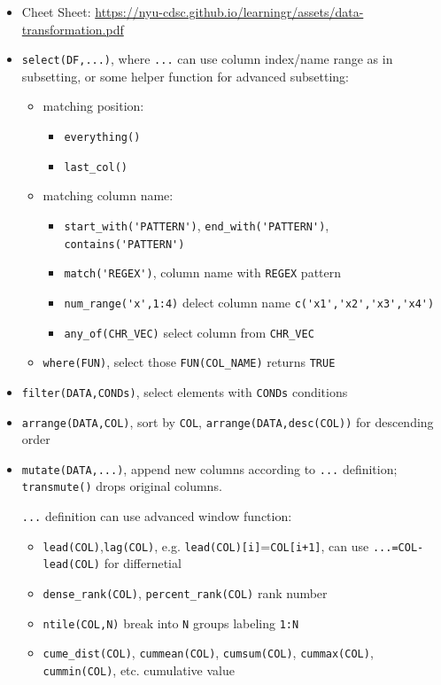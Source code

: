 \begin{itemize}[topsep=2pt,itemsep=0pt]
    \item Cheet Sheet: \url{https://nyu-cdsc.github.io/learningr/assets/data-transformation.pdf}
    \item \lstinline|select(DF,...)|, where \lstinline|...| can use column index/name range as in subsetting, or some helper function for advanced subsetting:
    \begin{itemize}[topsep=2pt,itemsep=0pt]
        \item matching position:
        \begin{itemize}[topsep=2pt,itemsep=0pt]
            \item \lstinline|everything()|
            \item \lstinline|last_col()|
        \end{itemize}
        \item matching column name:
        \begin{itemize}[topsep=2pt,itemsep=0pt]
            \item \lstinline|start_with('PATTERN')|, \lstinline|end_with('PATTERN')|, \lstinline|contains('PATTERN')|
            \item \lstinline|match('REGEX')|, column name with \lstinline|REGEX| pattern
            \item \lstinline|num_range('x',1:4)| delect column name \lstinline|c('x1','x2','x3','x4')|
            \item \lstinline|any_of(CHR_VEC)| select column from \lstinline|CHR_VEC|
        \end{itemize}
        \item \lstinline|where(FUN)|, select those \lstinline|FUN(COL_NAME)| returns \lstinline|TRUE|
    \end{itemize}
    \item \lstinline|filter(DATA,CONDs)|, select elements with \lstinline|CONDs| conditions
    \item \lstinline|arrange(DATA,COL)|, sort by \lstinline|COL|, \lstinline|arrange(DATA,desc(COL))| for descending order
    \item \lstinline|mutate(DATA,...)|, append new columns according to \lstinline|...| definition; \lstinline|transmute()| drops original columns.
    
    \lstinline|...| definition can use advanced window function:
    \begin{itemize}[topsep=2pt,itemsep=0pt]
        \item \lstinline|lead(COL)|,\lstinline|lag(COL)|, e.g. \lstinline|lead(COL)[i]|=\lstinline|COL[i+1]|, can use \lstinline|...=COL-lead(COL)| for differnetial
        \item \lstinline|dense_rank(COL)|, \lstinline|percent_rank(COL)| rank number
        \item \lstinline|ntile(COL,N)| break into \lstinline|N| groups labeling \lstinline|1:N|
        \item \lstinline|cume_dist(COL)|, \lstinline|cummean(COL)|, \lstinline|cumsum(COL)|, \lstinline|cummax(COL)|, \lstinline|cummin(COL)|, etc. cumulative value
    \end{itemize}
    

\end{itemize}
